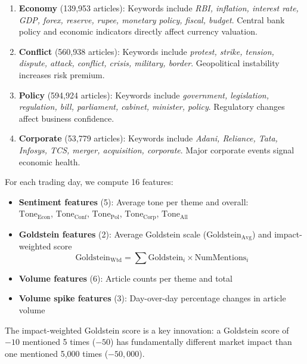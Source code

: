 \documentclass[11pt]{article}
\begin{document}
\begin{enumerate}
    \item \textbf{Economy} (139,953 articles): Keywords include \textit{RBI, inflation, interest rate, GDP, forex, reserve, rupee, monetary policy, fiscal, budget}. Central bank policy and economic indicators directly affect currency valuation.
    
    \item \textbf{Conflict} (560,938 articles): Keywords include \textit{protest, strike, tension, dispute, attack, conflict, crisis, military, border}. Geopolitical instability increases risk premium.
    
    \item \textbf{Policy} (594,924 articles): Keywords include \textit{government, legislation, regulation, bill, parliament, cabinet, minister, policy}. Regulatory changes affect business confidence.
    
    \item \textbf{Corporate} (53,779 articles): Keywords include \textit{Adani, Reliance, Tata, Infosys, TCS, merger, acquisition, corporate}. Major corporate events signal economic health.
\end{enumerate}

For each trading day, we compute 16 features:

\begin{itemize}
    \item \textbf{Sentiment features} (5): Average tone per theme and overall:\\$\text{Tone}_{\text{Econ}}$, $\text{Tone}_{\text{Conf}}$, $\text{Tone}_{\text{Pol}}$, $\text{Tone}_{\text{Corp}}$, $\text{Tone}_{\text{All}}$
    \item \textbf{Goldstein features} (2): Average Goldstein scale ($\text{Goldstein}_{\text{Avg}}$) and impact-weighted score
    \begin{equation*}
    \text{Goldstein}_{\text{Wtd}} = \textstyle\sum \text{Goldstein}_i \times \text{NumMentions}_i
    \end{equation*}
    \item \textbf{Volume features} (6): Article counts per theme and total
    \item \textbf{Volume spike features} (3): Day-over-day percentage changes in article volume
\end{itemize}

The impact-weighted Goldstein score is a key innovation: a Goldstein score of $-10$ mentioned 5 times ($-50$) has fundamentally different market impact than one mentioned 5,000 times ($-50,000$).
\end{document}
